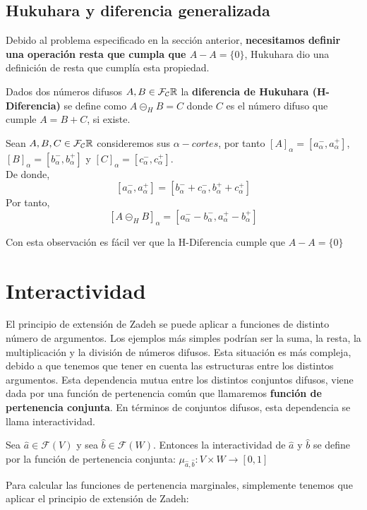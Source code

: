 \subsection{Hukuhara y diferencia generalizada} \label{def:hukukara}
Debido al problema especificado en la sección anterior, \textbf{necesitamos definir una operación resta que cumpla que $A-A=\{0\}$}, Hukuhara dio una definición de resta que cumplía esta propiedad.

\begin{definicion}
	Dados dos números difusos $A, B \in \mathcal{F}_\mathcal{C}\mathbb R$ la \textbf{diferencia de Hukuhara (H-Diferencia)} se define como $A \circleddash_H B = C$ donde $C$ es el número difuso que cumple $A=B+C$, si existe.
\end{definicion}

\begin{observacion}
	Sean $A, B, C \in \mathcal{F}_\mathcal{C}\mathbb R$ consideremos sus $\alpha - cortes$, por tanto $[A]_\alpha = [a^-_\alpha, a^+_\alpha]$, $[B]_\alpha = [b^-_\alpha, b^+_\alpha]$ y $[C]_\alpha = [c^-_\alpha, c^+_\alpha]$. \\
	De donde,
	$$
	[a^-_\alpha, a^+_\alpha] = [b^-_\alpha + c^-_\alpha, b^+_\alpha + c^+_\alpha]
	$$
	Por tanto, 
	$$
	[A \circleddash_H B]_\alpha = [a_\alpha^- - b_\alpha^-, a_\alpha^+ - b_\alpha^+]
	$$
\end{observacion}
Con esta observación es fácil ver que la H-Diferencia cumple que $A-A=\{0\}$


\section{Interactividad}
El principio de extensión de Zadeh se puede aplicar a funciones de distinto número de argumentos. Los ejemplos más simples podrían ser la suma, la resta, la multiplicación y la división de números difusos. Esta situación es más compleja, debido a que tenemos que tener en cuenta las estructuras entre los distintos argumentos. Esta dependencia mutua entre los distintos conjuntos difusos, viene dada por una función de pertenencia común que llamaremos \textbf{función de pertenencia conjunta}. En términos de conjuntos difusos, esta dependencia se llama interactividad.

\begin{definicion}
	Sea $\hat{a} \in \mathcal{F}(V)$ y sea $\hat{b} \in \mathcal{F}(W)$. Entonces la interactividad de $\hat{a}$ y $\hat{b}$ se define por la función de pertenencia conjunta: $\mu_{\hat{a}, \hat{b}} : V \times W \rightarrow [0, 1]$
\end{definicion}
Para calcular las funciones de pertenencia marginales, simplemente tenemos que aplicar el principio de extensión de Zadeh:

